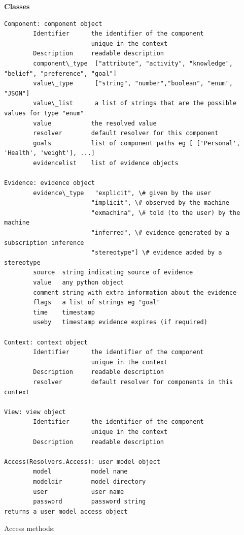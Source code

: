 \documentclass[letterpaper,10pt,english]{sphinxmanual}
\begin{document}
\textbf{Classes}

\begin{Verbatim}[commandchars=\\\{\}]
Component: component object
        Identifier      the identifier of the component
                        unique in the context
        Description     readable description
        component\_type  ["attribute", "activity", "knowledge", "belief", "preference", "goal"]
        value\_type      ["string", "number","boolean", "enum", "JSON"]
        value\_list      a list of strings that are the possible values for type "enum"
        value           the resolved value
        resolver        default resolver for this component
        goals           list of component paths eg [ ['Personal', 'Health', 'weight'], ...]
        evidencelist    list of evidence objects

Evidence: evidence object
        evidence\_type   "explicit", \# given by the user
                        "implicit", \# observed by the machine
                        "exmachina", \# told (to the user) by the machine
                        "inferred", \# evidence generated by a subscription inference
                        "stereotype"] \# evidence added by a stereotype
        source  string indicating source of evidence
        value   any python object
        comment string with extra information about the evidence
        flags   a list of strings eg "goal"
        time    timestamp
        useby   timestamp evidence expires (if required)

Context: context object
        Identifier      the identifier of the component
                        unique in the context
        Description     readable description
        resolver        default resolver for components in this context

View: view object
        Identifier      the identifier of the component
                        unique in the context
        Description     readable description

Access(Resolvers.Access): user model object
        model           model name
        modeldir        model directory
        user            user name
        password        password string
returns a user model access object
\end{Verbatim}

Access methods:
\end{document}
